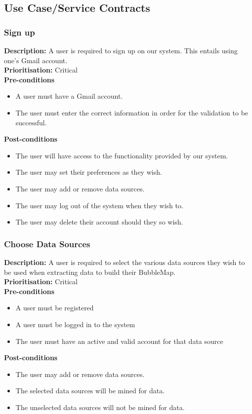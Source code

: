 \documentclass[hidelinks,english]{article}
\begin{document}
		\subsection{Use Case/Service Contracts}
			\subsubsection{Sign up}
				\textbf{Description:}  A user is required to sign up on our system. This entails using one's Gmail account.\\
    			\textbf{Prioritisation:} Critical\\
      			\textbf{Pre-conditions}
    			\begin{itemize}
        			\item A user must have a Gmail account.
        			\item The user must enter the correct information in order for the validation to be successful.
    			\end{itemize}
    			\textbf{Post-conditions}
     			\begin{itemize}
        			\item The user will have access to the functionality provided by our system.
        			\item The user may set their preferences as they wish.
        			\item The user may add or remove data sources.
        			\item The user may log out of the system when they wish to.
        			\item The user may delete their account should they so wish.
    			\end{itemize}
    		\subsubsection{Choose Data Sources}
				\textbf{Description:}  A user is required to select the various data sources they wish to be used when extracting data to build their BubbleMap.\\
    			\textbf{Prioritisation:} Critical\\
      			\textbf{Pre-conditions}
    			\begin{itemize}
        			\item A user must be registered
        			\item A user must be logged in to the system
        			\item The user must have an active and valid account for that data source
    			\end{itemize}
    			\textbf{Post-conditions}
     			\begin{itemize}
        			\item The user may add or remove data sources.
        			\item The selected data sources will be mined for data.
        			\item The unselected data sources will not be mined for data.
    			\end{itemize}
\end{document}
